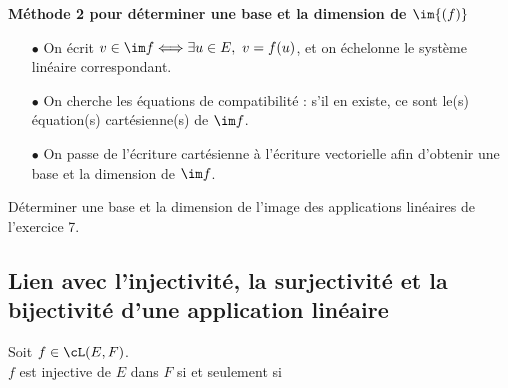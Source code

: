 \documentclass[a4paper, 11pt]{article}
\begin{document}
\vsec
 

\begin{dboxminipage}{0.9\textwidth}
\textbf{M\'ethode 2 pour d\'eterminer une base et la dimension de $\im{(f)}$}
\begin{itemize}
\item[$\bullet$] On \'ecrit $v\in\im f\Longleftrightarrow \exists u\in E,\ v=f(u)$, et on \'echelonne le syst\`eme lin\'eaire correspondant.
\item[$\bullet$] On cherche les \'equations de compatibilit\'e : s'il en existe, ce sont le(s) \'equation(s) cart\'esienne(s) de $\im f$.
\item[$\bullet$] On passe de l'\'ecriture cart\'esienne \`a l'\'ecriture vectorielle afin d'obtenir une base et la dimension de $\im f$.
\end{itemize}
\end{dboxminipage}


{\footnotesize \begin{exercice} D\'eterminer une base et la dimension de l'image des applications lin\'eaires de l'exercice 7.
\end{exercice}
}



 

\subsection{Lien avec l'injectivit\'e, la surjectivit\'e et la bijectivit\'e d'une application lin\'eaire}



\begin{prop}
Soit $f\in\cL(E,F)$.\vsec\\
\noindent $f$ est injective de $E$ dans $F$ si et seulement si \dotfill \vsec
\end{prop}
 
\end{document}
